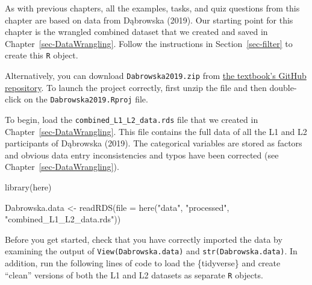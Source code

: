 \documentclass[
  letterpaper,
  DIV=11,
  numbers=noendperiod]{scrreprt}
\newenvironment{Shaded}{\begin{snugshade}}{\end{snugshade}}
\newcommand{\AttributeTok}[1]{\textcolor[rgb]{0.40,0.45,0.13}{#1}}
\newcommand{\FunctionTok}[1]{\textcolor[rgb]{0.28,0.35,0.67}{#1}}
\newcommand{\NormalTok}[1]{\textcolor[rgb]{0.00,0.23,0.31}{#1}}
\newcommand{\OtherTok}[1]{\textcolor[rgb]{0.00,0.23,0.31}{#1}}
\newcommand{\StringTok}[1]{\textcolor[rgb]{0.13,0.47,0.30}{#1}}
\begin{document}
\begin{tcolorbox}[enhanced jigsaw, arc=.35mm, bottomrule=.15mm, bottomtitle=1mm, breakable, colback=white, colbacktitle=quarto-callout-warning-color!10!white, colframe=quarto-callout-warning-color-frame, coltitle=black, left=2mm, leftrule=.75mm, opacityback=0, opacitybacktitle=0.6, rightrule=.15mm, title=\textcolor{quarto-callout-warning-color}{\faExclamationTriangle}\hspace{0.5em}{Prerequisites}, titlerule=0mm, toprule=.15mm, toptitle=1mm]

As with previous chapters, all the examples, tasks, and quiz questions
from this chapter are based on data from Dąbrowska (2019). Our starting
point for this chapter is the wrangled combined dataset that we created
and saved in Chapter~\ref{sec-DataWrangling}. Follow the instructions in
Section~\ref{sec-filter} to create this \texttt{R} object.

Alternatively, you can download \texttt{Dabrowska2019.zip} from
\href{https://github.com/elenlefoll/RstatsTextbook/raw/69d1e31be7394f2b612825f031ebffeb75886390/Dabrowska2019.zip}{the
textbook's GitHub repository}. To launch the project correctly, first
unzip the file and then double-click on the \texttt{Dabrowska2019.Rproj}
file.

To begin, load the \texttt{combined\_L1\_L2\_data.rds} file that we
created in Chapter~\ref{sec-DataWrangling}. This file contains the full
data of all the L1 and L2 participants of Dąbrowska (2019). The
categorical variables are stored as factors and obvious data entry
inconsistencies and typos have been corrected (see
Chapter~\ref{sec-DataWrangling}).

\begin{Shaded}
\begin{Highlighting}[]
\FunctionTok{library}\NormalTok{(here)}

\NormalTok{Dabrowska.data }\OtherTok{\textless{}{-}} \FunctionTok{readRDS}\NormalTok{(}\AttributeTok{file =} \FunctionTok{here}\NormalTok{(}\StringTok{"data"}\NormalTok{, }\StringTok{"processed"}\NormalTok{, }\StringTok{"combined\_L1\_L2\_data.rds"}\NormalTok{))}
\end{Highlighting}
\end{Shaded}

Before you get started, check that you have correctly imported the data
by examining the output of \texttt{View(Dabrowska.data)} and
\texttt{str(Dabrowska.data)}. In addition, run the following lines of
code to load the \{tidyverse\} and create ``clean'' versions of both the
L1 and L2 datasets as separate \texttt{R} objects.


\end{tcolorbox}
\end{document}
